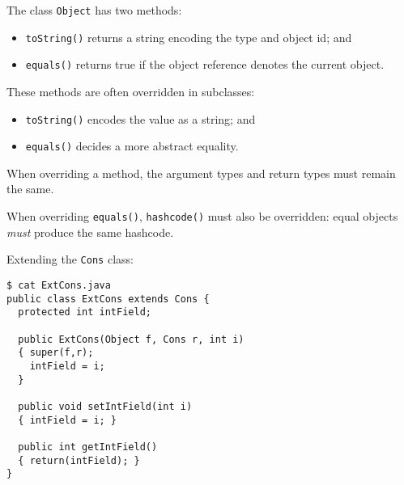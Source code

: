 \begin{slide*}
The class {\tt Object} has two methods:
\begin{itemize}
\item {\tt toString()} returns a string encoding the type and object id; and
\item {\tt equals()} returns true if the object reference denotes the current object.
\end{itemize}

\vspace{0.1in}

These methods are often overridden in subclasses:
\begin{itemize}
\item {\tt toString()} encodes the value as a string; and
\item {\tt equals()} decides a more abstract equality.
\end{itemize}

\vspace{0.1in}

When overriding a method, the argument types and return types must remain
the same.

\vspace{0.1in}

When overriding {\tt equals()}, {\tt hashcode()} must also be
overridden: equal objects {\em must} produce the same hashcode.
\vfil
\end{slide*}

\begin{slide*}
Extending the {\tt Cons} class:\\

\begin{scriptsize}
\begin{verbatim}
$ cat ExtCons.java
public class ExtCons extends Cons {
  protected int intField;
 
  public ExtCons(Object f, Cons r, int i)
  { super(f,r);
    intField = i;
  }
 
  public void setIntField(int i)
  { intField = i; }
 
  public int getIntField()
  { return(intField); }
}
\end{verbatim}
\end{scriptsize}
\vfil
\end{slide*}

